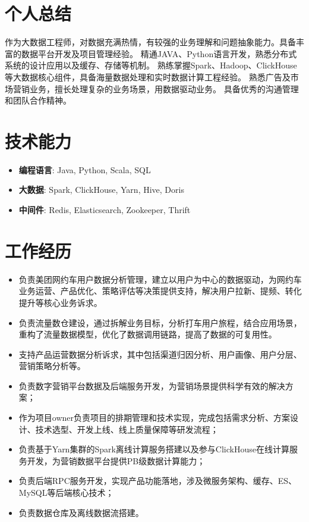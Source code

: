 \documentclass{resume}
\begin{document}

 
\section{个人总结}
作为大数据工程师，对数据充满热情，有较强的业务理解和问题抽象能力。具备丰富的数据平台开发及项目管理经验。
精通JAVA、Python语言开发，熟悉分布式系统的设计应用以及缓存、存储等机制。
熟练掌握Spark、Hadoop、ClickHouse等大数据核心组件，具备海量数据处理和实时数据计算工程经验。
熟悉广告及市场营销业务，擅长处理复杂的业务场景，用数据驱动业务。
具备优秀的沟通管理和团队合作精神。

\section{技术能力}
\begin{itemize}[parsep=0.2ex]
  \item \textbf{编程语言}: Java, Python, Scala, SQL
  \item \textbf{大数据}: Spark, ClickHouse, Yarn, Hive, Doris
  \item \textbf{中间件}: Redis, Elasticsearch, Zookeeper, Thrift
\end{itemize}

\section{工作经历}
\begin{itemize}
  \item 负责美团网约车用户数据分析管理，建立以用户为中心的数据驱动，为网约车业务运营、产品优化、策略评估等决策提供支持，解决用户拉新、提频、转化提升等核心业务诉求。
  \item 负责流量数仓建设，通过拆解业务目标，分析打车用户旅程，结合应用场景，重构了流量数据模型，优化了数据调用链路，提高了数据的可复用性。
  \item 支持产品运营数据分析诉求，其中包括渠道归因分析、用户画像、用户分层、营销策略分析等。
\end{itemize}

\begin{itemize}
  \item 负责数字营销平台数据及后端服务开发，为营销场景提供科学有效的解决方案；
  \item 作为项目owner负责项目的排期管理和技术实现，完成包括需求分析、方案设计、技术选型、开发上线、线上质量保障等研发流程；
  \item 负责基于Yarn集群的Spark离线计算服务搭建以及参与ClickHouse在线计算服务开发，为营销数据平台提供PB级数据计算能力；
  \item 负责后端RPC服务开发，实现产品功能落地，涉及微服务架构、缓存、ES、MySQL等后端核心技术；
  \item 负责数据仓库及离线数据流搭建。
\end{itemize}
\end{document}
